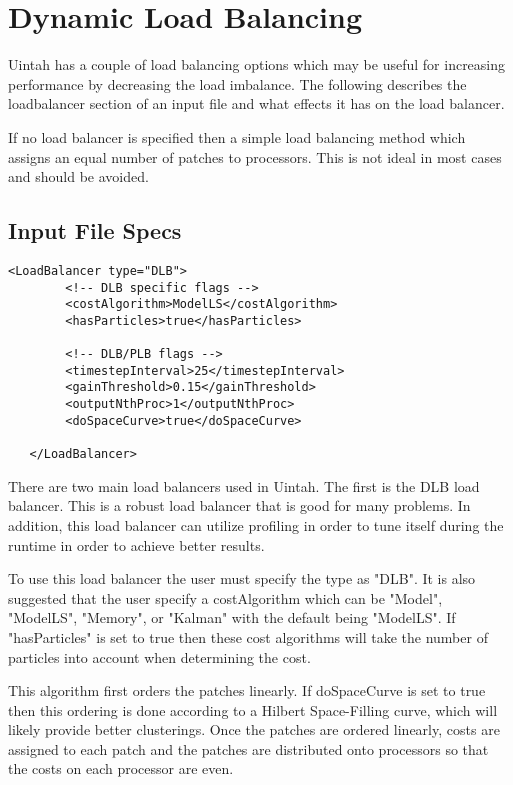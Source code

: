 \section{Dynamic Load Balancing} \label{loadbalancer}

Uintah has a couple of load balancing options which may be useful for increasing performance by decreasing
the load imbalance.  The following describes the loadbalancer section of an input file and what effects
it has on the load balancer.  

If no load balancer is specified then a simple load balancing method which assigns an equal number of patches
to processors. This is not ideal in most cases and should be avoided.

\subsection{Input File Specs}
\begin{Verbatim}[fontsize=\footnotesize]
   <LoadBalancer type="DLB"> 
        <!-- DLB specific flags -->
        <costAlgorithm>ModelLS</costAlgorithm>
        <hasParticles>true</hasParticles>

        <!-- DLB/PLB flags -->
        <timestepInterval>25</timestepInterval>
        <gainThreshold>0.15</gainThreshold>
        <outputNthProc>1</outputNthProc>
        <doSpaceCurve>true</doSpaceCurve>

   </LoadBalancer>
\end{Verbatim}

There are two main load balancers used in Uintah.  The first is the DLB load balancer.
This is a robust load balancer that is good for many problems.  In addition,
this load balancer can utilize profiling in order to tune itself during the runtime
in order to achieve better results.  

To use this load balancer the user must specify the type as "DLB".  It is also suggested
that the user specify a costAlgorithm which can be "Model", "ModelLS", "Memory", or
"Kalman" with the default being "ModelLS".  If "hasParticles" is set to true then
these cost algorithms will take the number of particles into account when determining
the cost.

This algorithm first orders the patches linearly.  If doSpaceCurve is set to true
then this ordering is done according to a Hilbert Space-Filling curve, which will
likely provide better clusterings.  Once the patches are ordered linearly, costs
are assigned to each patch and the patches are distributed onto processors so that
the costs on each processor are even.  

